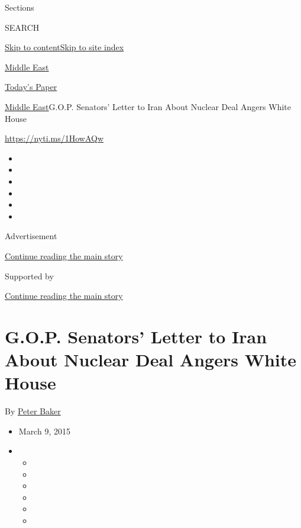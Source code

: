 Sections

SEARCH

\protect\hyperlink{site-content}{Skip to
content}\protect\hyperlink{site-index}{Skip to site index}

\href{https://www.nytimes.com/section/world/middleeast}{Middle East}

\href{https://myaccount.nytimes.com/auth/login?response_type=cookie\&client_id=vi}{}

\href{https://www.nytimes.com/section/todayspaper}{Today's Paper}

\href{/section/world/middleeast}{Middle East}\textbar{}G.O.P. Senators'
Letter to Iran About Nuclear Deal Angers White House

\url{https://nyti.ms/1HowAQw}

\begin{itemize}
\item
\item
\item
\item
\item
\item
\end{itemize}

Advertisement

\protect\hyperlink{after-top}{Continue reading the main story}

Supported by

\protect\hyperlink{after-sponsor}{Continue reading the main story}

\hypertarget{gop-senators-letter-to-iran-about-nuclear-deal-angers-white-house}{%
\section{G.O.P. Senators' Letter to Iran About Nuclear Deal Angers White
House}\label{gop-senators-letter-to-iran-about-nuclear-deal-angers-white-house}}

By \href{http://www.nytimes.com/by/peter-baker}{Peter Baker}

\begin{itemize}
\item
  March 9, 2015
\item
  \begin{itemize}
  \item
  \item
  \item
  \item
  \item
  \item
  \end{itemize}
\end{itemize}


